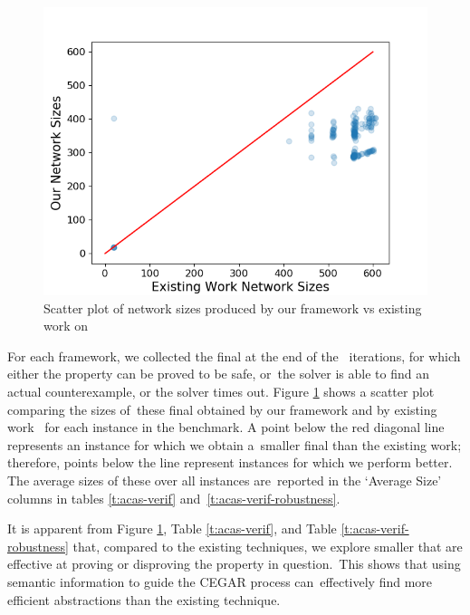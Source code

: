 \begin{figure}
    \vspace*{-0.5cm}
    \includegraphics[scale=0.4]{scatter-cegar-our-nerualsat-diag-new.png}
    \vspace{0.15cm}
    \caption{Scatter plot of network sizes produced by our framework vs existing
    work \cite{cegar-nn} on \acasxu }
    \label{f:scatter-netsizes}
    \vspace*{-0.5cm}
\end{figure}

For each framework, we collected the final \abs at the end of the \cegar iterations, for which either the property can be proved to be safe, or the solver is able to find an actual counterexample, or the solver times out. Figure \ref{f:scatter-netsizes} shows a scatter plot comparing the sizes of these final \abs obtained by our framework and by existing work \cite{cegar-nn} for each instance in the benchmark.
A point below the red diagonal line represents an instance for which we obtain a smaller final \abs than the existing work; therefore, points below the line represent instances for which we perform better.
The average sizes of these \abs over all instances are reported in the `Average Size' columns in tables \ref{t:acas-verif} and \ref{t:acas-verif-robustness}.

It is apparent from Figure \ref{f:scatter-netsizes}, Table \ref{t:acas-verif}, and Table \ref{t:acas-verif-robustness} that, compared to the existing techniques, we explore smaller \abs that are effective at proving or disproving the property in question. This shows that using semantic information to guide the CEGAR process can effectively find more efficient abstractions than the existing technique.


